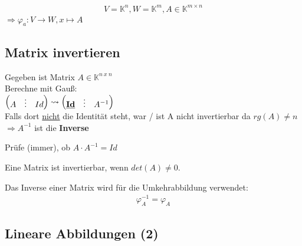 \documentclass{scrartcl}
\begin{document}
\begin{Beispiel}

\[V = \mathbb{K}^n, W = \mathbb{K}^m, A \in \mathbb{K}^{m \times n}\]
$\Rightarrow \varphi_a : V \rightarrow W, x \mapsto A$

\end{Beispiel}

\subsection{Matrix invertieren}
Gegeben ist Matrix $A \in \mathbb{K}^{n~x~n}$\\
Berechne mit Gauß:\\
$\begin{pmatrix} A & \vdots & Id \end{pmatrix} \leadsto \begin{pmatrix} \textbf{\underline{Id}} & \vdots & A^{-1} \end{pmatrix} $\\
Falls dort \underline{nicht} die Identität steht, war / ist A nicht invertierbar da $ rg(A) \neq n $\\
$\Rightarrow A^{-1} $ ist die \textbf{Inverse}
\begin{Notiz}
Prüfe (immer), ob $A \cdot A^{-1} = Id$
\end{Notiz}

\begin{Notiz}
    Eine Matrix ist invertierbar, wenn $det(A) \neq 0$.
\end{Notiz}
\begin{Notiz}[Umkehrabbildung]
    Das Inverse einer Matrix wird für die Umkehrabbildung verwendet:
    \begin{align*}
    \varphi_A^{-1} = \varphi_{A}
    \end{align*}
\end{Notiz}

\subsection{Lineare Abbildungen (2)}
\end{document}
